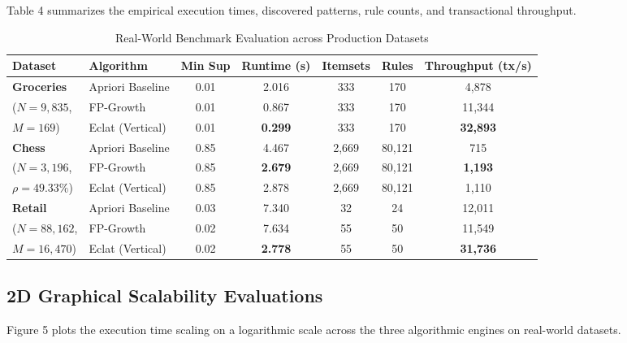\documentclass[11pt,a4paper]{article}
\newcommand{\toprule}{\hline\hline}
\newcommand{\midrule}{\hline}
\newcommand{\bottomrule}{\hline\hline}
\begin{document}
Table 4 summarizes the empirical execution times, discovered patterns, rule counts, and transactional throughput.

\begin{table}[!ht]
\centering
\caption{Real-World Benchmark Evaluation across Production Datasets}
\vspace{0.2em}
\scriptsize
\begin{tabular}{llccccc}
\toprule
\textbf{Dataset} & \textbf{Algorithm} & \textbf{Min Sup} & \textbf{Runtime (s)} & \textbf{Itemsets} & \textbf{Rules} & \textbf{Throughput (tx/s)} \\
\midrule
\textbf{Groceries} & Apriori Baseline & 0.01 & 2.016 & 333 & 170 & 4,878 \\
($N = 9,835$, & FP-Growth & 0.01 & 0.867 & 333 & 170 & 11,344 \\
$M = 169$) & Eclat (Vertical) & 0.01 & \textbf{0.299} & 333 & 170 & \textbf{32,893} \\
\midrule
\textbf{Chess} & Apriori Baseline & 0.85 & 4.467 & 2,669 & 80,121 & 715 \\
($N = 3,196$, & FP-Growth & 0.85 & \textbf{2.679} & 2,669 & 80,121 & \textbf{1,193} \\
$\rho = 49.33\%$) & Eclat (Vertical) & 0.85 & 2.878 & 2,669 & 80,121 & 1,110 \\
\midrule
\textbf{Retail} & Apriori Baseline & 0.03 & 7.340 & 32 & 24 & 12,011 \\
($N = 88,162$, & FP-Growth & 0.02 & 7.634 & 55 & 50 & 11,549 \\
$M = 16,470$) & Eclat (Vertical) & 0.02 & \textbf{2.778} & 55 & 50 & \textbf{31,736} \\
\bottomrule
\end{tabular}
\end{table}

\subsection{2D Graphical Scalability Evaluations}

Figure 5 plots the execution time scaling on a logarithmic scale across the three algorithmic engines on real-world datasets.
\end{document}
